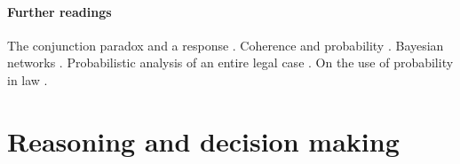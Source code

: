 \documentclass[10pt]{article}
\begin{document}
\paragraph{Further readings}
The conjunction paradox \citep{cohen1977} and a response \citep{dawid1987}. 
Coherence and probability \citep{bovensHartman2003}.
Bayesian networks \citep{taroniEtal2006}. Probabilistic 
analysis of an entire legal case \citep{kadaneSchum1996}.
On the use of probability in law \citep{fenton2011}.






\section{Reasoning and decision making}
\label{sec:whenconv}
\label{sec:intexc}

\end{document}
